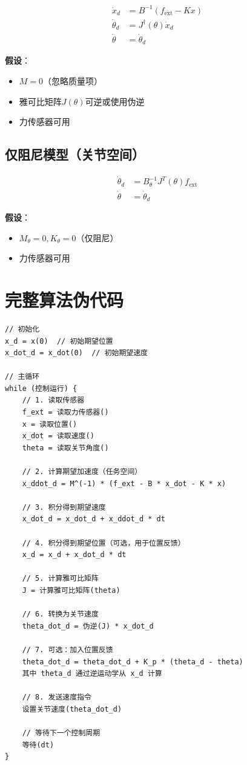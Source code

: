 \documentclass[12pt,a4paper]{article}
\begin{document}
\begin{align}
\dot{x}_d &= B^{-1}(f_{\text{ext}} - Kx) \\
\dot{\theta}_d &= J^{\dagger}(\theta)\dot{x}_d \\
\dot{\theta} &= \dot{\theta}_d
\end{align}

\textbf{假设}：
\begin{itemize}
\item $M = 0$（忽略质量项）
\item 雅可比矩阵$J(\theta)$可逆或使用伪逆
\item 力传感器可用
\end{itemize}

\subsection{仅阻尼模型（关节空间）}

\begin{align}
\dot{\theta}_d &= B_{\theta}^{-1}J^T(\theta) f_{\text{ext}} \\
\dot{\theta} &= \dot{\theta}_d
\end{align}

\textbf{假设}：
\begin{itemize}
\item $M_{\theta} = 0, K_{\theta} = 0$（仅阻尼）
\item 力传感器可用
\end{itemize}

\section{完整算法伪代码}

\begin{verbatim}
// 初始化
x_d = x(0)  // 初始期望位置
x_dot_d = x_dot(0)  // 初始期望速度

// 主循环
while (控制运行) {
    // 1. 读取传感器
    f_ext = 读取力传感器()
    x = 读取位置()
    x_dot = 读取速度()
    theta = 读取关节角度()
    
    // 2. 计算期望加速度（任务空间）
    x_ddot_d = M^(-1) * (f_ext - B * x_dot - K * x)
    
    // 3. 积分得到期望速度
    x_dot_d = x_dot_d + x_ddot_d * dt
    
    // 4. 积分得到期望位置（可选，用于位置反馈）
    x_d = x_d + x_dot_d * dt
    
    // 5. 计算雅可比矩阵
    J = 计算雅可比矩阵(theta)
    
    // 6. 转换为关节速度
    theta_dot_d = 伪逆(J) * x_dot_d
    
    // 7. 可选：加入位置反馈
    theta_dot_d = theta_dot_d + K_p * (theta_d - theta)
    其中 theta_d 通过逆运动学从 x_d 计算
    
    // 8. 发送速度指令
    设置关节速度(theta_dot_d)
    
    // 等待下一个控制周期
    等待(dt)
}
\end{verbatim}
\end{document}
